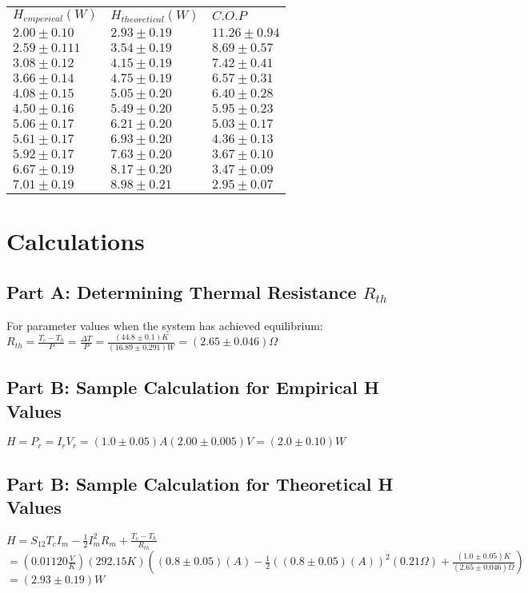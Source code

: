 \documentclass{article}
\begin{document}
\begin{tabular}{lll}
$H_{emperical} (W)$ & $H_{theoretical} (W)$ & $C.O.P$\\
$2.00\pm0.10$ & $2.93\pm0.19$ & $11.26\pm0.94$\\
$2.59\pm0.111$ & $3.54\pm0.19$ & $8.69\pm0.57$\\
$3.08\pm0.12$ & $4.15\pm0.19$ & $7.42\pm0.41$\\
$3.66\pm0.14$ & $4.75\pm0.19$ & $6.57\pm0.31$\\
$4.08\pm0.15$ & $5.05\pm0.20$ & $6.40\pm0.28$\\
$4.50\pm0.16$ & $5.49\pm0.20$ & $5.95\pm0.23$\\
$5.06\pm0.17$ & $6.21\pm0.20$ & $5.03\pm0.17$\\
$5.61\pm0.17$ & $6.93\pm0.20$ & $4.36\pm0.13$\\
$5.92\pm0.17$ & $7.63\pm0.20$ & $3.67\pm0.10$\\
$6.67\pm0.19$ & $8.17\pm0.20$ & $3.47\pm0.09$\\
$7.01\pm0.19$ & $8.98\pm0.21$ & $2.95\pm0.07$\\
\end{tabular}


\section{Calculations}
\subsection{Part A: Determining Thermal Resistance $R_{th}$}
For parameter values when the system has achieved equilibrium:\\
$R_{th}= \frac{T_c-T_h}{P}=\frac{\Delta T}{P}=\frac{(44.8\pm0.1)K}{(16.89 \pm 0.291)W}=(2.65\pm0.046)\Omega$
\subsection{Part B: Sample Calculation for Empirical H Values}
$H=P_r=I_rV_r=(1.0\pm0.05)A(2.00\pm0.005)V=(2.0\pm0.10)W$
\subsection{Part B: Sample Calculation for Theoretical H Values}
$H=S_{12}T_cI_m-\frac{1}{2}I^2_mR_m+\frac{T_c-T_h}{R_{th}}$\\
$=(0.01120\frac{V}{K})(292.15K)((0.8\pm0.05)(A)-\frac{1}{2}((0.8\pm0.05)(A))^2(0.21\Omega)+\frac{(1.0\pm0.05)K}{(2.65\pm0.046)\Omega})$\\
$=(2.93\pm0.19)W$
\end{document}
